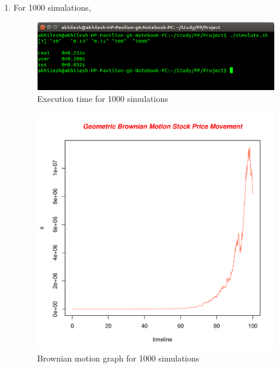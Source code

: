 \documentclass[10pt,a4paper]{article}
\begin{document}
\begin{enumerate}
\newpage
\item For 1000 simulations,\\
\begin{figure}[h]
\centering
\includegraphics[scale=0.5]{1000}
\caption{Execution time for 1000 simulations}
\end{figure}
\begin{figure}[h]
\centering
\includegraphics[scale=0.5]{1000_graph.pdf}
\caption{Brownian motion graph for 1000 simulations}
\end{figure}


\end{enumerate}
\end{document}

